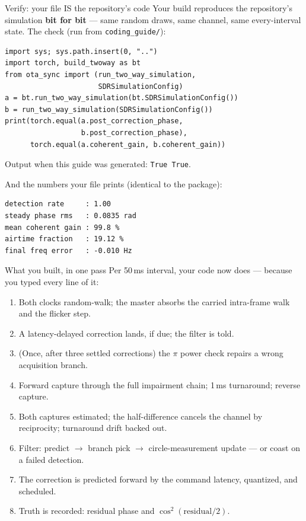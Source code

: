 \documentclass[10pt]{beamer}
\begin{document}
\begin{frame}[fragile]{Verify: your file IS the repository's code}
  Your build reproduces the repository's simulation \textbf{bit for
  bit} --- same random draws, same channel, same every-interval
  state. The check (run from \texttt{coding\_guide/}):
\begin{lstlisting}
import sys; sys.path.insert(0, "..")
import torch, build_twoway as bt
from ota_sync import (run_two_way_simulation,
                      SDRSimulationConfig)
a = bt.run_two_way_simulation(bt.SDRSimulationConfig())
b = run_two_way_simulation(SDRSimulationConfig())
print(torch.equal(a.post_correction_phase,
                  b.post_correction_phase),
      torch.equal(a.coherent_gain, b.coherent_gain))
\end{lstlisting}
  Output when this guide was generated: \texttt{True True}.
  \vspace{0.4em}

  And the numbers your file prints (identical to the package):
\begin{lstlisting}[language={}]
detection rate     : 1.00
steady phase rms   : 0.0835 rad
mean coherent gain : 99.8 %
airtime fraction   : 19.12 %
final freq error   : -0.010 Hz
\end{lstlisting}
\end{frame}

\begin{frame}{What you built, in one pass}
  Per 50\,ms interval, your code now does --- because you typed every
  line of it:
  \begin{enumerate}
    \item Both clocks random-walk; the master absorbs the carried
      intra-frame walk and the flicker step.
    \item A latency-delayed correction lands, if due; the filter is
      told.
    \item (Once, after three settled corrections) the $\pi$ power
      check repairs a wrong acquisition branch.
    \item Forward capture through the full impairment chain; 1\,ms
      turnaround; reverse capture.
    \item Both captures estimated; the half-difference cancels the
      channel by reciprocity; turnaround drift backed out.
    \item Filter: predict $\to$ branch pick $\to$ circle-measurement
      update --- or coast on a failed detection.
    \item The correction is predicted forward by the command latency,
      quantized, and scheduled.
    \item Truth is recorded: residual phase and
      $\cos^2(\text{residual}/2)$.
  \end{enumerate}
\end{frame}
\end{document}
